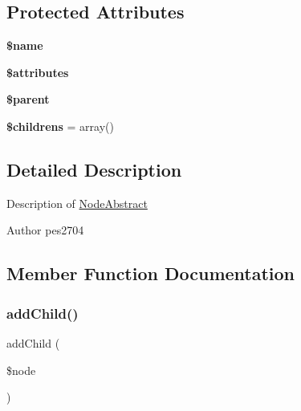 \subsection*{Protected Attributes}
\begin{DoxyCompactItemize}
\item 
\mbox{\label{class_pes_1_1_dom_1_1_node_1_1_node_abstract_ab2fc40d43824ea3e1ce5d86dee0d763b}} 
{\bfseries \$name}
\item 
\mbox{\label{class_pes_1_1_dom_1_1_node_1_1_node_abstract_adc851f7a62250e75df0490c0280aef4c}} 
{\bfseries \$attributes}
\item 
\mbox{\label{class_pes_1_1_dom_1_1_node_1_1_node_abstract_a4e2313a4b35b72a06ac45fd38960f677}} 
{\bfseries \$parent}
\item 
\mbox{\label{class_pes_1_1_dom_1_1_node_1_1_node_abstract_ac732f5640006b77455042dc58d95a68b}} 
{\bfseries \$childrens} = array()
\end{DoxyCompactItemize}


\subsection{Detailed Description}
Description of \mbox{\hyperlink{class_pes_1_1_dom_1_1_node_1_1_node_abstract}{Node\+Abstract}} \begin{DoxyAuthor}{Author}
pes2704 
\end{DoxyAuthor}


\subsection{Member Function Documentation}
\mbox{\label{class_pes_1_1_dom_1_1_node_1_1_node_abstract_a1d59c3782ba90a94f31ee6c58d86e9fc}} 
\subsubsection{\texorpdfstring{add\+Child()}{addChild()}}
{\footnotesize\ttfamily add\+Child (\begin{DoxyParamCaption}\item[{\mbox{\hyperlink{interface_pes_1_1_dom_1_1_node_1_1_node_interface}{Node\+Interface}}}]{\$node }\end{DoxyParamCaption})}

